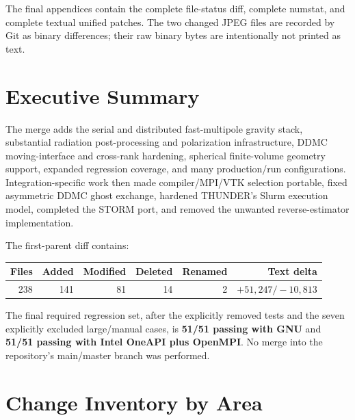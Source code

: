 \documentclass[10pt,a4paper]{article}
\begin{document}
The final appendices contain the complete file-status diff, complete numstat,
and complete textual unified patches.  The two changed JPEG files are recorded
by Git as binary differences; their raw binary bytes are intentionally not
printed as text.

\section{Executive Summary}

The merge adds the serial and distributed fast-multipole gravity stack,
substantial radiation post-processing and polarization infrastructure,
DDMC moving-interface and cross-rank hardening, spherical finite-volume
geometry support, expanded regression coverage, and many production/run
configurations.  Integration-specific work then made compiler/MPI/VTK
selection portable, fixed asymmetric DDMC ghost exchange, hardened THUNDER's
Slurm execution model, completed the STORM port, and removed the unwanted
reverse-estimator implementation.

The first-parent diff contains:
\begin{center}
\begin{tabular}{@{}rrrrrr@{}}
\toprule
Files & Added & Modified & Deleted & Renamed & Text delta \\
\midrule
238 & 141 & 81 & 14 & 2 & $+51{,}247/-10{,}813$ \\
\bottomrule
\end{tabular}
\end{center}

The final required regression set, after the explicitly removed tests and the
seven explicitly excluded large/manual cases, is \textbf{51/51 passing with
GNU} and \textbf{51/51 passing with Intel OneAPI plus OpenMPI}.  No merge into
the repository's main/master branch was performed.

\section{Change Inventory by Area}
\end{document}
